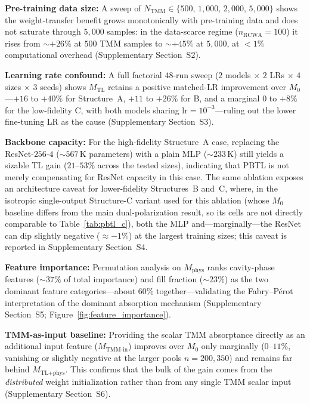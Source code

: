 \documentclass[a4paper,fleqn]{cas-sc}
\newcommand{\Mzero}{M_0}
\newcommand{\Mphys}{M_\text{phys}}
\newcommand{\Mtl}{M_\text{TL}}
\newcommand{\Mtlphys}{M_\text{TL+phys}}
\begin{document}
\textbf{Pre-training data size:} A sweep of $N_\text{TMM}\!\in\!\{500,\,1{,}000,\,2{,}000,\,5{,}000\}$ shows the weight-transfer benefit grows monotonically with pre-training data and does not saturate through $5{,}000$ samples: in the data-scarce regime ($n_\text{RCWA}{=}100$) it rises from ${\sim}{+}26\%$ at $500$ TMM samples to ${\sim}{+}45\%$ at $5{,}000$, at $<\!1\%$ computational overhead (Supplementary Section~S2).

\textbf{Learning rate confound:} A full factorial $48$-run sweep ($2$ models $\times$ $2$ LRs $\times$ $4$ sizes $\times$ $3$ seeds) shows $\Mtl$ retains a positive matched-LR improvement over $\Mzero$---$+16$ to $+40\%$ for Structure~A, $+11$ to $+26\%$ for B, and a marginal $0$ to $+8\%$ for the low-fidelity C, with both models sharing $\text{lr}{=}10^{-3}$---ruling out the lower fine-tuning LR as the cause (Supplementary Section~S3).

\textbf{Backbone capacity:} For the high-fidelity Structure~A case, replacing the ResNet-$256$-$4$ (${\sim}567$\,K parameters) with a plain MLP (${\sim}233$\,K) still yields a sizable TL gain ($21$--$53\%$ across the tested sizes), indicating that PBTL is not merely compensating for ResNet capacity in this case. The same ablation exposes an architecture caveat for lower-fidelity Structures~B and~C, where, in the isotropic single-output Structure-C variant used for this ablation (whose $\Mzero$ baseline differs from the main dual-polarization result, so its cells are not directly comparable to Table~\ref{tab:pbtl_c}), both the MLP and---marginally---the ResNet can dip slightly negative (${\approx}-1\%$) at the largest training sizes; this caveat is reported in Supplementary Section~S4.

\textbf{Feature importance:} Permutation analysis on $\Mphys$ ranks cavity-phase features (${\sim}37\%$ of total importance) and fill fraction (${\sim}23\%$) as the two dominant feature categories---about $60\%$ together---validating the Fabry--P\'{e}rot interpretation of the dominant absorption mechanism (Supplementary Section~S5; Figure~\ref{fig:feature_importance}).

\textbf{TMM-as-input baseline:} Providing the scalar TMM absorptance directly as an additional input feature ($M_\text{TMM-in}$) improves over $\Mzero$ only marginally ($0$--$11\%$, vanishing or slightly negative at the larger pools $n{=}200,350$) and remains far behind $\Mtlphys$. This confirms that the bulk of the gain comes from the \emph{distributed} weight initialization rather than from any single TMM scalar input (Supplementary Section~S6).
\end{document}
